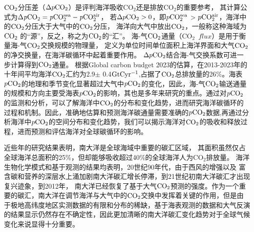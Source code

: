 $\rm CO_2$分压差（$\Delta p\rm CO_2$）是评判海洋吸收$\mathrm{CO_2}$还是排放$\mathrm{CO_2}$的重要参考，
其计算公式为$\Delta \mathit{p}\rm{CO_2} = \mathit{p}\rm{CO_2^{sea}} - \mathit{p}\rm{CO_2^{air}}$，
若$\Delta p \rm{CO_2}>0 $，即$p\rm CO_2^{sea}$ > $p\rm CO_2^{air}$，海洋中的$\rm CO_2$分压大于大气中的$\rm CO_2$分压，
海洋向大气中放出$\rm CO_2$，一般称这种海域为$\rm CO_2$ 的“源”，反之，称之为$\rm CO_2$的“汇”。
海-气$\rm CO_2$通量（$\mathrm{CO_2}$\ $flux$）是用于衡量海-气$\rm CO_2$交换规模的物理量，
定义为单位时间单位面积上海洋界面和大气$\rm CO_2$的净交换量，在海洋碳循环中起着重要作用。 
$\Delta p \rm CO_2$结合海-气交换系数可进一步计算得到$\rm CO_2$通量。
根据Global carbon budget 2023的估算\cite{budget2023global}，在2013-2023年的十年间平均海洋$\rm CO_2$汇约为2.9$\pm$ 0.4$\rm GtC yr^{-1}$,占据了$\rm CO_2$总排放量的26\%\cite{budget2023global}。海表$p\rm CO_2$的地理和季节变化显著超过大气中$p\rm CO_2$的变化，因此，海-气$\rm CO_2$输送通量的规模和方向主要受海表$p\rm CO_2$的影响，其也是多年来研究的重点。通过对$p\rm CO_2$ 的监测和分析，可以了解海洋中$\rm CO_2$的分布和变化趋势，进而研究海洋碳循环的过程和机制。因此，准确地估算和预测海洋碳通量需要准确的$p\rm CO_2$数据,再通过分析海洋中$p\rm CO_2$的空间分布和变化趋势，我们可以揭示海洋对$\rm CO_2$的吸收和释放过程，进而预测和评估海洋对全球碳循环的影响。

近些年的研究结果表明\cite{khatiwala2009reconstruction,devries2014oceanic}，南大洋是全球海域中重要的碳汇区域，
其面积虽然仅占全球海洋总面积的25\%，但却能够吸收超过40\%的全球海洋人为$\mathrm{CO_2}$排放量。
海洋生物化学模式和基于观测的结果\cite{hauck2013seasonally}均表明，20世纪90年代，由于西风的增强以及
富含碳和营养的深层水上涌加剧南大洋碳汇增长停滞，到21世纪初南大洋碳汇才出现复兴迹象，到2012年，
南大洋已经恢复了基于大气$\rm CO_2$预测的强度\cite{landschutzer2015reinvigoration}。作为一个重要的碳汇，南大洋在调节海洋与大气中的$\rm CO_2$交换中发挥着关键的作用，但是由于极地高纬度地区实测数据的有限和分布的稀缺，基于海表观测的数据和大气反演的结果显示仍然存在不确定性\cite{Global_Carbon_Budget_2022}，因此更加清晰的南大洋碳汇变化趋势对于全球气候变化来说显得十分重要。

